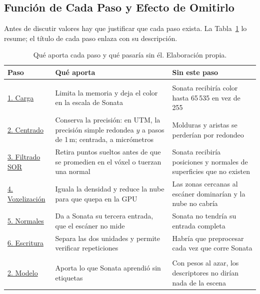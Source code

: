 \FloatBarrier
\subsection{Función de Cada Paso y Efecto de Omitirlo}
\label{sec:param-funcion}

Antes de discutir valores hay que justificar que cada paso exista. La
Tabla~\ref{tab:funcion} lo resume; el título de cada paso enlaza con su
descripción.

\begin{table}[!htbp]
\centering
{}\small
\setlength{\tabcolsep}{4pt}
\caption[Qué aporta cada paso y qué pasaría sin él]{Qué aporta cada paso y qué pasaría sin él. Elaboración propia.}
\label{tab:funcion}
\begin{tabularx}{\linewidth}{@{}>{\raggedright\arraybackslash\hsize=0.6\hsize}X>{\raggedright\arraybackslash\hsize=1.2\hsize}X>{\raggedright\arraybackslash\hsize=1.2\hsize}X@{}}
\toprule
\textbf{Paso} & \textbf{Qué aporta} & \textbf{Sin este paso} \\
\midrule
\multicolumn{3}{@{}l}{\textit{Unidad 1}}\\
\hyperref[sec:u1-p1]{1. Carga} & Limita la memoria y deja el color en la escala de Sonata & Sonata recibiría color hasta 65\,535 en vez de 255 \\
\hyperref[sec:u1-p2]{2. Centrado} & Conserva la precisión: en UTM, la precisión simple redondea $y$ a pasos de 1\,m; centrada, a micrómetros & Molduras y aristas se perderían por redondeo \\
\hyperref[sec:u1-p3]{3. Filtrado SOR} & Retira puntos sueltos antes de que se promedien en el vóxel o tuerzan una normal & Sonata recibiría posiciones y normales de superficies que no existen \\
\hyperref[sec:u1-p4]{4. Voxelización} & Iguala la densidad y reduce la nube para que quepa en la GPU & Las zonas cercanas al escáner dominarían y la nube no cabría \\
\hyperref[sec:u1-p5]{5. Normales} & Da a Sonata su tercera entrada, que el escáner no mide & Sonata no tendría su entrada completa \\
\hyperref[sec:u1-p6]{6. Escritura} & Separa las dos unidades y permite verificar repeticiones & Habría que preprocesar cada vez que corre Sonata \\
\midrule
\multicolumn{3}{@{}l}{\textit{Unidad 2}}\\
\hyperref[sec:u2-p2]{2. Modelo} & Aporta lo que Sonata aprendió sin etiquetas & Con pesos al azar, los descriptores no dirían nada de la escena \\

\end{tabularx}
\end{table}
